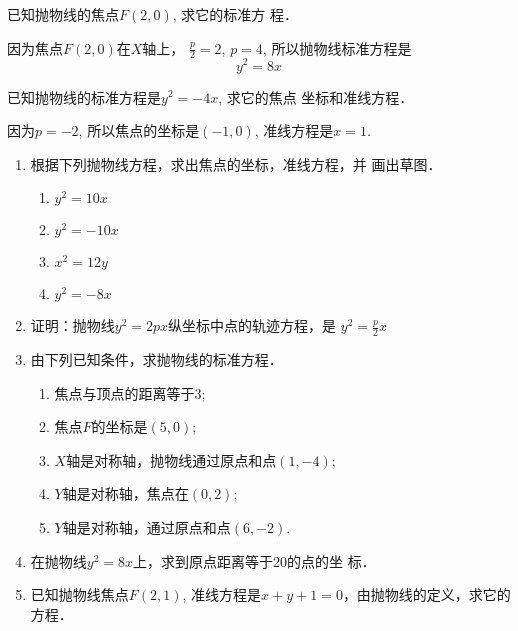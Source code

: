 \begin{example}
    已知抛物线的焦点$F(2,0)$, 求它的标准方
程．
\end{example}


\begin{solution}
    因为焦点$F(2,0)$在$X$轴上，
$\frac{p}{2}=2$, $p=4$, 
所以抛物线标准方程是
\[y^2=8x\]
\end{solution}



\begin{example}
    已知抛物线的标准方程是$y^2=-4x$, 求它的焦点
坐标和准线方程．
\end{example}

\begin{solution}
    因为$p=-2$, 所以焦点的坐标是$(-1,0)$, 
准线方程是$x=1$.
\end{solution}

\begin{ex}
\begin{enumerate}
    \item 根据下列抛物线方程，求出焦点的坐标，准线方程，并
    画出草图．
\begin{multicols}{2}
\begin{enumerate}
  \item $y^2=10x$  
\item $y^2=-10x$
\item $x^2=12y$  
\item $y^2=-8x$
\end{enumerate}
\end{multicols}

    \item 证明：抛物线$y^2=2px$纵坐标中点的轨迹方程，是
$y^2=\frac{p}{2}x$
    \item 由下列已知条件，求抛物线的标准方程．
\begin{enumerate}
\item 焦点与顶点的距离等于3;
\item 焦点$F$的坐标是$(5,0)$;
\item $X$轴是对称轴，抛物线通过原点和点$(1,-4)$;
\item $Y$轴是对称轴，焦点在$(0,2)$;
\item $Y$轴是对称轴，通过原点和点$(6,-2)$.
\end{enumerate}

    \item 在抛物线$y^2=8x$上，求到原点距离等于20的点的坐
    标．
    \item 已知抛物线焦点$F(2,1)$, 准线方程是$x+y+1=0$，由抛物线的定义，求它的方程．
\end{enumerate}
\end{ex}

